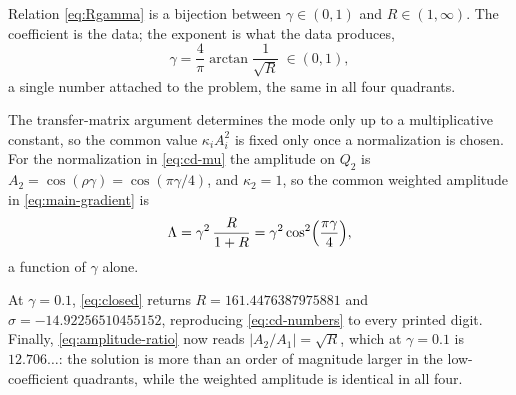 \documentclass[10pt,pdftex]{amsart}%
\numberwithin{equation}{section}
\begin{document}
Relation \eqref{eq:Rgamma} is a bijection between $\gamma\in(0,1)$ and $R\in(1,\infty)$.  The coefficient is the data; the exponent is what the data produces,
\begin{equation}\label{eq:gamma-from-R}
  \gamma=\frac4\pi\arctan\frac1{\sqrt R}\ \in(0,1),
\end{equation}
a single number attached to the problem, the same in all four quadrants.

The transfer-matrix argument determines the mode only up to a multiplicative constant, so the common value $\kappa_iA_i^2$ is fixed only once a normalization is chosen.  For the normalization in \eqref{eq:cd-mu} the amplitude on $Q_2$ is $A_2=\cos(\rho\gamma)=\cos(\pi\gamma/4)$, and $\kappa_2=1$, so the common weighted amplitude in \eqref{eq:main-gradient} is
\begin{equation}\label{eq:Lambda-closed}
  \Lambda=\gamma^2\,\frac{R}{1+R}=\gamma^2\cos^2\Bigl(\frac{\pi\gamma}{4}\Bigr),
\end{equation}
a function of $\gamma$ alone.

At $\gamma=0.1$, \eqref{eq:closed} returns $R=161.4476387975881$ and $\sigma=-14.92256510455152$, reproducing \eqref{eq:cd-numbers} to every printed digit.  Finally, \eqref{eq:amplitude-ratio} now reads $|A_2/A_1|=\sqrt R$, which at $\gamma=0.1$ is $12.706\ldots$: the solution is more than an order of magnitude larger in the low-coefficient quadrants, while the weighted amplitude is identical in all four.
\end{document}
